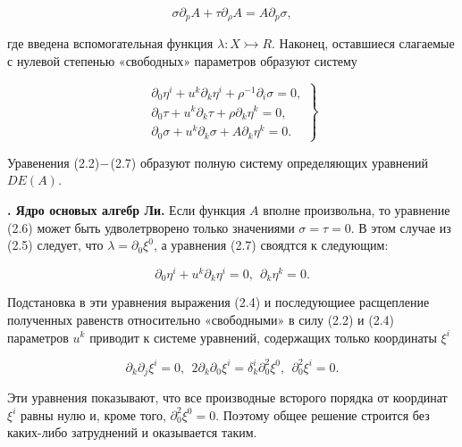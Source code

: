 \documentclass{report}
\newcounter{nrazd}
\newcommand{\razd}[1]{\addtocounter{nrazd}{1}
	\setcounter{equation}{0}
	\textbf{\thenrazd. #1}}
\begin{document}
	\begin{equation} \label{eq2.6}
		\sigma\partial_p A + \tau\partial_\rho A = A \partial_p \sigma,
	\end{equation}

	где введена вспомогательная функция $\lambda : X \rightarrowtail R$.
	Наконец, оставшиеся слагаемые с нулевой степенью «свободных» параметров образуют систему

	\begin{equation} \label{eq2.1} \left.
		\begin{array}{r}
			\partial_0 \eta^i + u^k \partial_k \eta^i + \rho^{-1} \partial_i \sigma = 0, \\
			\partial_0 \tau + u^k \partial_k \tau + \rho \partial_k \eta^k = 0, \\
			\partial_0 \sigma + u^k \partial_k \sigma + A\partial_k \eta^k = 0.
		\end{array}
		\right\} \end{equation}


	Уравенения (2.2)$\--$(2.7)  образуют полную систему определяющих уравнений $DE(A)$.


	\razd{Ядро основых алгебр Ли.}
	Если функция $A$ вполне произвольна, то уравнение (2.6) может быть удволетрворено только значениями
	$\sigma = \tau = 0$. В этом случае из (2.5) следует, что $\lambda = \partial_0 \xi^0$, а уравнения (2.7) своядтся к следующим:

	\begin{equation} \label{eq3.1}
		\partial_0 \eta^i + u^k \partial_k \eta^i = 0, \ \ \partial_k \eta^k = 0.
	\end{equation}

	Подстановка в эти уравнения выражения (2.4) и последующиее расщепление полученных равенств относительно
	«свободными» в силу (2.2) и (2.4) параметров $u^k$ приводит к системе уравнений, содержащих только координаты $\xi^i$

	\begin{equation} \label{eq3.2}
		\partial_k \partial_j \xi^i = 0, \ \ 2\partial_k \partial_0 \xi^i = \delta^i_k \partial^2_0 \xi^0, \ \ \partial^2_0 \xi^i = 0.
	\end{equation}

	Эти уравнения показывают, что все производные всторого порядка от координат $\xi^i$ равны нулю и, кроме того,
	$\partial^2_0 \xi^0 = 0$. Поэтому общее решение строится без каких-либо затруднений и оказывается таким.
\end{document}
